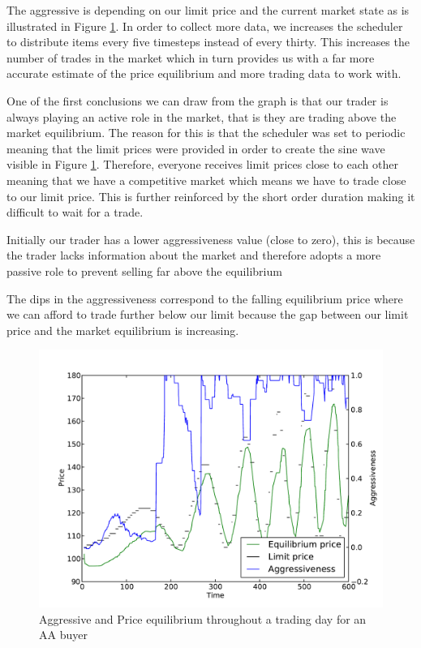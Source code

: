 \documentclass[preprint]{acm_proc_article-sp} %
\begin{document}
The aggressive is depending on our limit price and the current market state as
is illustrated in Figure \ref{fig:avtime}. In order to collect more data, we
increases the scheduler to distribute items every five timesteps instead of
every thirty. This increases the number of trades in the market which in turn
provides us with a far more accurate estimate of the price equilibrium and more
trading data to work with.

One of the first conclusions we can draw from the graph is that our trader is
always playing an active role in the market, that is they are trading above the
market equilibrium. The reason for this is that the scheduler was set to
periodic meaning that the limit prices were provided in order to create the
sine wave visible in Figure \ref{fig:avtime}. Therefore, everyone receives limit
prices close to each other meaning that we have a competitive market which
means we have to trade close to our limit price. This is further reinforced by
the short order duration making it difficult to wait for a trade.

Initially our trader has a lower aggressiveness value (close to zero), this is
because the trader lacks information about the market and therefore adopts a
more passive role to prevent selling far above the equilibrium

The dips in the aggressiveness correspond to the falling equilibrium price
where we can afford to trade further below our limit because the gap between
our limit price and the market equilibrium is increasing.

\begin{figure} 
  \centering
  \label{fig:avtime}
  \includegraphics[width=\columnwidth]{graphs_and_stats/aggressiveness_vs_price.pdf}
  \caption{Aggressive and Price equilibrium throughout a trading day for an AA
  buyer}
\end{figure}
\end{document}
